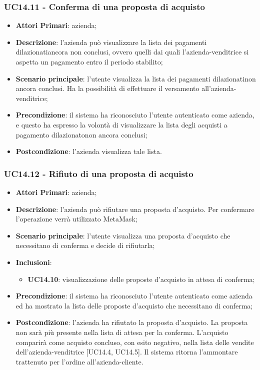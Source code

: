 \subsubsection{UC14.11 - Conferma di una proposta di acquisto}
\begin{itemize}
	\item \textbf{Attori Primari}: azienda;
	\item \textbf{Descrizione}: l'azienda può visualizzare la lista dei pagamenti dilazionati\glosp ancora non conclusi, ovvero quelli dai quali l'azienda-venditrice si aspetta un pagamento entro il periodo stabilito;
	\item \textbf{Scenario principale}: l'utente visualizza la lista dei pagamenti dilazionati\glosp non ancora conclusi. Ha la possibilità di effettuare il versamento all'azienda-venditrice;
	\item \textbf{Precondizione}: il sistema ha riconosciuto l'utente autenticato come azienda, e questo ha espresso la volontà di visualizzare la lista degli acquisti a pagamento dilazionato\glosp non ancora conclusi;
	\item \textbf{Postcondizione}: l'azienda visualizza tale lista.
\end{itemize}

\subsubsection{UC14.12 - Rifiuto di una proposta di acquisto}
\begin{itemize}
	\item \textbf{Attori Primari}: azienda;
	\item \textbf{Descrizione}: l'azienda può rifiutare una proposta d'acquisto. Per confermare l'operazione verrà utilizzato MetaMask\glo;
	\item \textbf{Scenario principale}: l'utente visualizza una proposta d'acquisto che necessitano di conferma e decide di rifiutarla;
		\item \textbf{Inclusioni}: 
	\begin{itemize}
		\item \textbf{UC14.10}: visualizzazione delle proposte d'acquisto in attesa di conferma;
	\end{itemize}
	\item \textbf{Precondizione}: il sistema ha riconosciuto l'utente autenticato come azienda ed ha mostrato la lista delle proposte d'acquisto che necessitano di conferma;
	\item \textbf{Postcondizione}: l'azienda ha rifiutato la proposta d'acquisto. La proposta non sarà più presente nella lista di attesa per la conferma. L'acquisto comparirà come acquisto concluso, con esito negativo, nella lista delle vendite dell'azienda-venditrice [UC14.4, UC14.5]. Il sistema ritorna l'ammontare trattenuto per l'ordine all'azienda-cliente.
\end{itemize}

